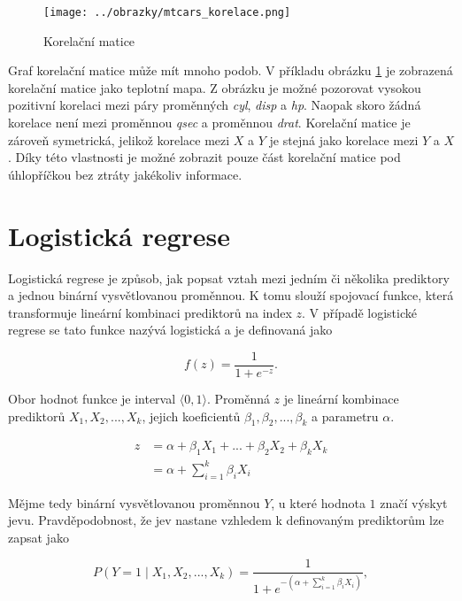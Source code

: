 \begin{figure}[H]
    \centering
    \texttt{[image: ../obrazky/mtcars\_korelace.png]}
    \caption{Korelační matice} 
    \label{fig:mtcars_korelace}
\end{figure}

Graf korelační matice může mít mnoho podob. V příkladu obrázku \ref{fig:mtcars_korelace} je zobrazená korelační matice jako teplotní mapa. Z obrázku je možné pozorovat vysokou
pozitivní korelaci mezi páry proměnných \textit{cyl}, \textit{disp} a \textit{hp}. Naopak skoro žádná korelace není mezi proměnnou \textit{qsec} a proměnnou \textit{drat}.
Korelační matice je zároveň symetrická, jelikož korelace mezi $X$ a $Y$ je stejná jako korelace mezi $Y$ a $X$. Díky této vlastnosti je možné zobrazit pouze část 
korelační matice pod úhlopříčkou bez ztráty jakékoliv informace.

\newpage
\section{Logistická regrese}
Logistická regrese je způsob, jak popsat vztah mezi jedním či několika prediktory a jednou binární vysvětlovanou 
proměnnou. K tomu slouží spojovací funkce, která transformuje lineární kombinaci prediktorů na index $z$. V případě
logistické regrese se tato funkce nazývá logistická a je definovaná jako

\begin{equation}
    \label{eq:logisticka_funkce}
    f(z) = \frac{1}{1 + e^{-z}}.
\end{equation}

Obor hodnot funkce je interval $\langle 0, 1 \rangle$. Proměnná $z$ je lineární kombinace prediktorů  $X_1, X_2, ..., X_k$, 
jejich koeficientů $\beta_1, \beta_2, ..., \beta_k$ a parametru $\alpha$.

\begin{equation}
    \label{eq:linearni_kombinace_z}
    \begin{split}
        z &= \alpha + \beta_1 X_1 + ... + \beta_2 X_2 +\beta_k X_k \\
          &= \alpha + \sum_{i=1}^k \beta_i X_i
    \end{split}
\end{equation}

Mějme tedy binární vysvětlovanou proměnnou $Y$, u které hodnota $1$ značí výskyt jevu. Pravděpodobnost, že jev nastane
vzhledem k definovaným prediktorům lze zapsat jako

\begin{equation}
    \label{eq:pravdepodobnost_y}
    P(Y = 1 \mid X_1, X_2, ..., X_k) = \frac{1}{1 + e^{- \left( \alpha + \sum_{i=1}^k \beta_i X_i \right) }},
\end{equation}

